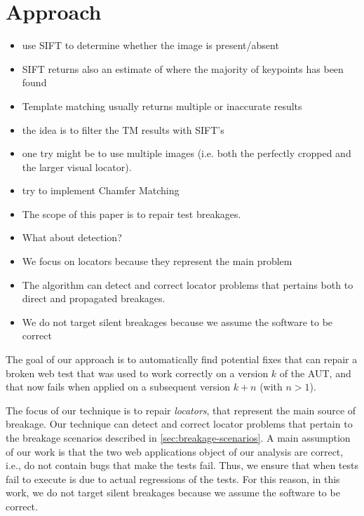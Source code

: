 \section{Approach}\label{sec:approach}

\begin{itemize}
\item use SIFT to determine whether the image is present/absent
\item SIFT returns also an estimate of where the majority of keypoints has been found
\item Template matching usually returns multiple or inaccurate results
\item the idea is to filter the TM results with SIFT's
\item one try might be to use multiple images (i.e. both the perfectly cropped and the larger visual locator).
\item try to implement Chamfer Matching
\end{itemize}

\begin{itemize}
\item The scope of this paper is to repair test breakages. 
\item What about detection?
\item We focus on locators because they represent the main problem
\item The algorithm can detect and correct locator problems that pertains both to direct and propagated breakages.
\item We do not target silent breakages because we assume the software to be correct
\end{itemize}

The goal of our approach is to automatically find potential fixes that can repair a broken web test that was used to work correctly on a  version $k$ of the AUT, and that now fails when applied on a subsequent version $k+n$ (with $n>1$).

The focus of our technique is to repair \textit{locators}, that represent the main source of breakage.
Our technique can detect and correct locator problems that pertain to the breakage scenarios described in \autoref{sec:breakage-scenarios}. A main assumption of our work is that the two web applications object of our analysis are correct, i.e., do not contain bugs that make the tests fail. Thus, we ensure that when tests fail to execute is due to actual regressions of the tests. For this reason, in this work, we do not target silent breakages because we assume the software to be correct.

